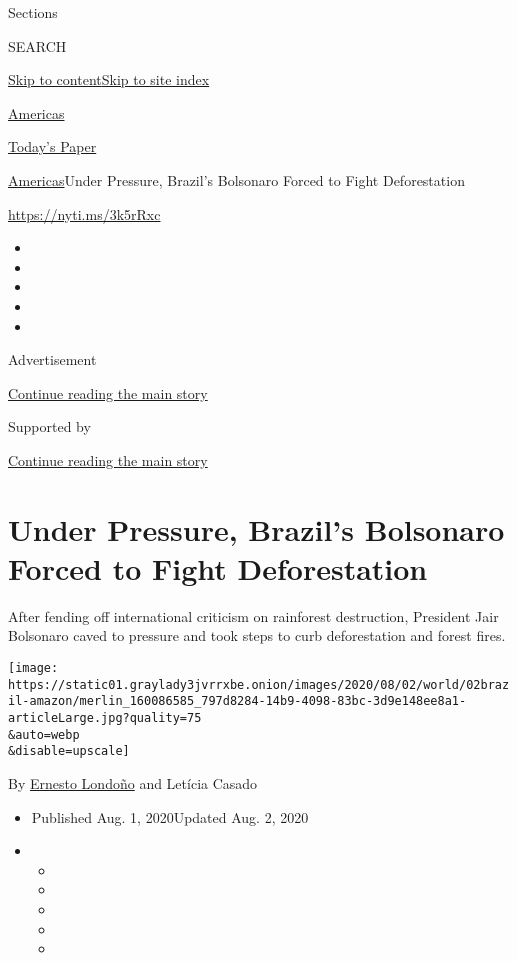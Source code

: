Sections

SEARCH

\protect\hyperlink{site-content}{Skip to
content}\protect\hyperlink{site-index}{Skip to site index}

\href{https://www.nytimes3xbfgragh.onion/section/world/americas}{Americas}

\href{https://myaccount.nytimes3xbfgragh.onion/auth/login?response_type=cookie\&client_id=vi}{}

\href{https://www.nytimes3xbfgragh.onion/section/todayspaper}{Today's
Paper}

\href{/section/world/americas}{Americas}\textbar{}Under Pressure,
Brazil's Bolsonaro Forced to Fight Deforestation

\url{https://nyti.ms/3k5rRxc}

\begin{itemize}
\item
\item
\item
\item
\item
\end{itemize}

Advertisement

\protect\hyperlink{after-top}{Continue reading the main story}

Supported by

\protect\hyperlink{after-sponsor}{Continue reading the main story}

\hypertarget{under-pressure-brazils-bolsonaro-forced-to-fight-deforestation}{%
\section{Under Pressure, Brazil's Bolsonaro Forced to Fight
Deforestation}\label{under-pressure-brazils-bolsonaro-forced-to-fight-deforestation}}

After fending off international criticism on rainforest destruction,
President Jair Bolsonaro caved to pressure and took steps to curb
deforestation and forest fires.

\texttt{[image: https://static01.graylady3jvrrxbe.onion/images/2020/08/02/world/02brazil-amazon/merlin\_160086585\_797d8284-14b9-4098-83bc-3d9e148ee8a1-articleLarge.jpg?quality=75\\\&auto=webp\\\&disable=upscale]}

By \href{https://www.nytimes3xbfgragh.onion/by/ernesto-londono}{Ernesto
Londoño} and Letícia Casado

\begin{itemize}
\item
  Published Aug. 1, 2020Updated Aug. 2, 2020
\item
  \begin{itemize}
  \item
  \item
  \item
  \item
  \item
  \end{itemize}
\end{itemize}

